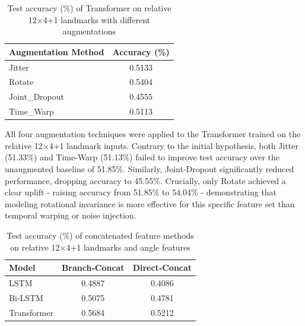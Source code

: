\documentclass[journal,onecolumn, 11pt]{IEEEtran}
\begin{document}
\begin{table}[H]
\centering
\caption{Test accuracy (\%) of Transformer on relative 12$\times$4+1 landmarks with different augmentations}
\label{tab:augmentation-results}
\begin{tabular}{l c}
\hline
\textbf{Augmentation Method} & \textbf{Accuracy (\%)} \\
\hline
Jitter                       & 0.5133                 \\
Rotate                       & 0.5404                \\
Joint\_Dropout          & 0.4555                 \\
Time\_Warp                & 0.5113                 \\
\hline
\end{tabular}
\end{table}

All four augmentation techniques were applied to the Transformer trained on the relative 12$\times$4+1 landmark inputs. Contrary to the initial hypothesis, both Jitter (51.33\%) and Time-Warp (51.13\%) failed to improve test accuracy over the unaugmented baseline of 51.85\%. Similarly, Joint-Dropout significantly reduced performance, dropping accuracy to 45.55\%. Crucially, only Rotate achieved a clear uplift - raising accuracy from 51.85\% to 54.04\% - demonstrating that modeling rotational invariance is more effective for this specific feature set than temporal warping or noise injection.

\begin{table}[H]
\centering
\caption{Test accuracy (\%) of concatenated feature methods on relative 12$\times$4+1 landmarks and angle features}
\label{tab:concat-results}
\begin{tabular}{l c c}
\hline
\textbf{Model}    & \textbf{Branch‐Concat} & \textbf{Direct‐Concat} \\
\hline
LSTM              & 0.4887                 & 0.4086                 \\
Bi‐LSTM           & 0.5075                 & 0.4781                 \\
Transformer   & 0.5684                 & 0.5212                 \\
\hline
\end{tabular}
\end{table}
\end{document}
